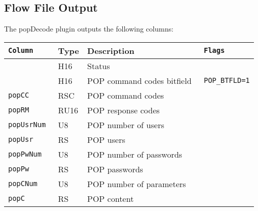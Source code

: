 \documentclass[documentation]{subfiles}
\begin{document}
\subsection{Flow File Output}
The popDecode plugin outputs the following columns:
\begin{longtable}{>{\tt}lll>{\tt\small}l}
    \toprule
    {\bf Column} & {\bf Type} & {\bf Description} & {\bf Flags}\\
    \midrule\endhead%
    \nameref{popStat} & H16  & Status                     & \\
    \nameref{popCBF}  & H16  & POP command codes bitfield & POP\_BTFLD=1\\
    popCC             & RSC  & POP command codes          & \\
    popRM             & RU16 & POP response codes         & \\
    popUsrNum         & U8   & POP number of users        & \\
    popUsr            & RS   & POP users                  & \\
    popPwNum          & U8   & POP number of passwords    & \\
    popPw             & RS   & POP passwords              & \\
    popCNum           & U8   & POP number of parameters   & \\
    popC              & RS   & POP content                & \\
    \bottomrule
\end{longtable}
\end{document}

